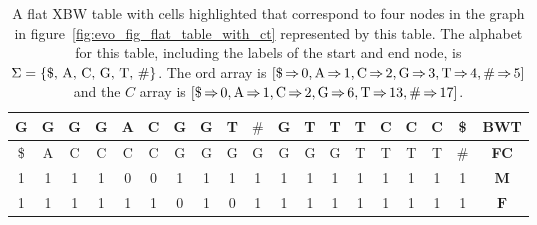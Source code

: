 \documentclass[a4paper,12pt,twoside,BCOR=10mm]{scrbook}
\begin{document}
{
\begin{table}[htb]
\centering
\caption[Flat table corresponding to a graph]{A flat XBW table with cells highlighted that correspond to four nodes in the graph in figure~\ref{fig:evo_fig_flat_table_with_ct} represented by this table. The alphabet for this table, including the labels of the start and end node, is $ \Sigma = \{ \textup{\$, A, C, G, T, $\#$} \} $. The \textup{ord} array is $ [ \$ {\, \Rightarrow \,} 0, \textup{A} {\, \Rightarrow \,} 1, \textup{C} {\, \Rightarrow \,} 2, \textup{G} {\, \Rightarrow \,} 3, \textup{T} {\, \Rightarrow \,} 4, \textup{$\#$} {\, \Rightarrow \,} 5 ] $ and the $ C $ array is $ [ \$ {\, \Rightarrow \,} 0, \textup{A} {\, \Rightarrow \,} 1, \textup{C} {\, \Rightarrow \,} 2, \textup{G} {\, \Rightarrow \,} 6, \textup{T} {\, \Rightarrow \,} 13, \textup{$\#$} {\, \Rightarrow \,} 17 ] $.}
\begin{tabular}{ | c | c | c | c | c | c | c | c | c | c | c | c | c | c | c | c | c | c | c | }
\hline
G & G & G &\cellcolor{purple_bg}\color{purple_fx}G & A & C & G &\cellcolor{green_bg}\color{green_fx}G &\cellcolor{green_bg}\color{green_fx}T & $\#$ & G & T & T &\cellcolor{red_bg}\color{red_fx}T & C & C &\cellcolor{blue_bg}\color{blue_fx}C & \$ & \textbf{BWT} \\ \hline
\$ & A & C &\cellcolor{purple_bg}\color{purple_fx}C &\cellcolor{purple_bg}\color{purple_fx}C &\cellcolor{purple_bg}\color{purple_fx}C & G & G &\cellcolor{green_bg}\color{green_fx}G & G & G & G & G &\cellcolor{red_bg}\color{red_fx}T & T & T &\cellcolor{blue_bg}\color{blue_fx}T & $\#$ & \textbf{FC} \\ \hline
1 & 1 & 1 &\cellcolor{purple_bg}\color{purple_fx}1 &\cellcolor{purple_bg}\color{purple_fx}0 &\cellcolor{purple_bg}\color{purple_fx}0 & 1 & 1 &\cellcolor{green_bg}\color{green_fx}1 & 1 & 1 & 1 & 1 &\cellcolor{red_bg}\color{red_fx}1 & 1 & 1 &\cellcolor{blue_bg}\color{blue_fx}1 & 1 & $\boldsymbol{M}$ \\ \hline
1 & 1 & 1 &\cellcolor{purple_bg}\color{purple_fx}1 & 1 & 1 & 0 &\cellcolor{green_bg}\color{green_fx}1 &\cellcolor{green_bg}\color{green_fx}0 & 1 & 1 & 1 & 1 &\cellcolor{red_bg}\color{red_fx}1 & 1 & 1 &\cellcolor{blue_bg}\color{blue_fx}1 & 1 & $\boldsymbol{F}$ \\ \hline
\end{tabular}
\label{table:flat_table_with_ct}
\end{table}
}
\end{document}
